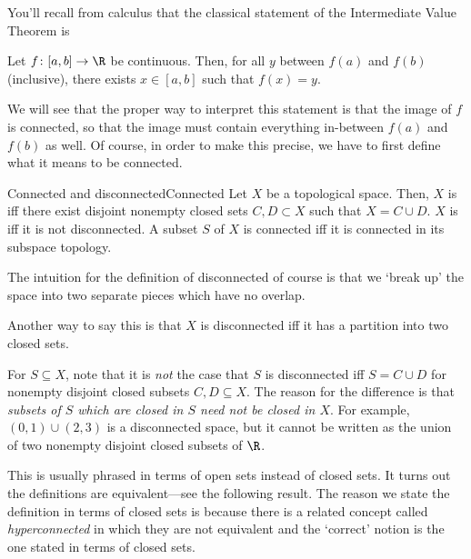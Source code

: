 You'll recall from calculus that the classical statement of the Intermediate Value Theorem is
\begin{textequation}
Let $f\colon [a,b]\rightarrow \R$ be continuous.  Then, for all $y$ between $f(a)$ and $f(b)$ (inclusive), there exists $x\in [a,b]$ such that $f(x)=y$.
\end{textequation}
We will see that the proper way to interpret this statement is that the image of $f$ is connected, so that the image must contain everything in-between $f(a)$ and $f(b)$ as well.  Of course, in order to make this precise, we have to first define what it means to be connected.
\begin{dfn}{Connected and disconnected}{Connected}
Let $X$ be a topological space.  Then, $X$ is  iff there exist disjoint nonempty closed sets $C,D\subset X$ such that $X=C\cup D$.  $X$ is  iff it is not disconnected.  A subset $S$ of $X$ is connected iff it is connected in its subspace topology.
\begin{rmk}
The intuition for the definition of disconnected of course is that we `break up' the space into two separate pieces which have no overlap.
\end{rmk}
\begin{rmk}
Another way to say this is that $X$ is disconnected iff it has a partition into two closed sets.
\end{rmk}
\begin{rmk}
For $S\subseteq X$, note that it is \emph{not} the case that $S$ is disconnected iff $S=C\cup D$ for nonempty disjoint closed subsets $C,D\subseteq X$.  The reason for the difference is that \emph{subsets of $S$ which are closed in $S$ need not be closed in $X$}.  For example, $(0,1)\cup (2,3)$ is a disconnected space, but it cannot be written as the union of two nonempty disjoint closed subsets of $\R$.
\end{rmk}
\begin{rmk}
This is usually phrased in terms of open sets instead of closed sets.  It turns out the definitions are equivalent---see the following result.  The reason we state the definition in terms of closed sets is because there is a related concept called \emph{hyperconnected} in which they are not equivalent and the `correct' notion is the one stated in terms of closed sets.
\end{rmk}
\end{dfn}
